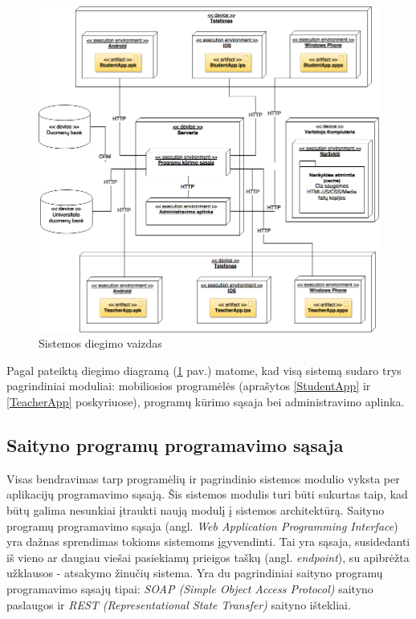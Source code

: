 \documentclass{VUMIFPSkursinis}
\begin{document}
\begin{figure}[H]
	\centering
	\includegraphics[scale=0.5]{img/kursinio_deployment.png}
	\caption{Sistemos diegimo vaizdas}
	\label{img:deployment}
\end{figure}

Pagal pateiktą diegimo diagramą (\ref{img:deployment} pav.) matome, kad visą sistemą sudaro trys pagrindiniai moduliai: mobiliosios programėlės (aprašytos \ref{StudentApp} ir \ref{TeacherApp} poskyriuose), programų kūrimo sąsaja bei administravimo aplinka.

\subsection{Saityno programų programavimo sąsaja}

Visas bendravimas tarp programėlių ir pagrindinio sistemos modulio vyksta per aplikacijų programavimo sąsają. Šis sistemos modulis turi būti sukurtas taip, kad būtų galima nesunkiai įtraukti naują modulį į sistemos architektūrą. Saityno programų programavimo sąsaja (angl. \textit{Web Application Programming Interface}) yra dažnas sprendimas tokioms sistemoms įgyvendinti. Tai yra sąsaja, susidedanti iš vieno ar daugiau viešai pasiekiamų prieigos taškų (angl. \textit{endpoint}), su apibrėžta užklausos - atsakymo žinučių sistema. Yra du pagrindiniai saityno programų programavimo sąsajų tipai: \textit{SOAP (Simple Object Access Protocol)} saityno paslaugos ir \textit{REST (Representational State Transfer)} saityno ištekliai.
\end{document}
